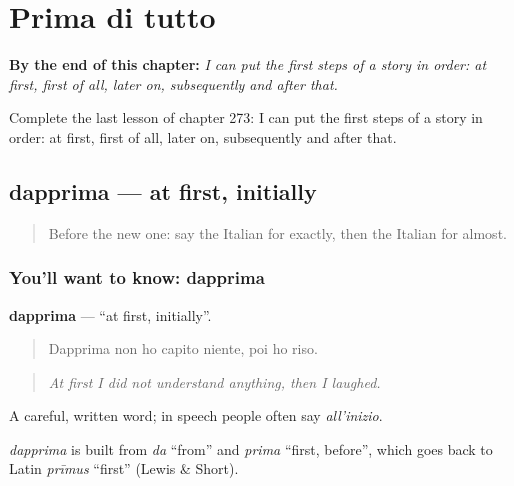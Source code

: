 
\chapter{Prima di tutto}
\label{ch:it-prima-di-tutto}

\begin{chapteropening}
\textbf{By the end of this chapter:} \emph{I can put the first steps of a story in order: at first, first of all, later on, subsequently and after that.}

Complete the last lesson of chapter 273: I can put the first steps of a story in order: at first, first of all, later on, subsequently and after that.
\end{chapteropening}

\section[dapprima]{dapprima — at first, initially}

\label{lesson:IT-C273-dapprima}



\begin{quote}
Before the new one: say the Italian for exactly, then the Italian for almost.
\end{quote}

\subsection*{You'll want to know: dapprima}
\textbf{dapprima} — \textquotedblleft{}at first, initially\textquotedblright{}.

\begin{quote}
Dapprima non ho capito niente, poi ho riso.
\end{quote}

\begin{quote}
\emph{At first I did not understand anything, then I laughed.}
\end{quote}

A careful, written word; in speech people often say \emph{all'inizio}.

\begin{cousinweb}
\emph{dapprima} is built from \emph{da} \textquotedblleft{}from\textquotedblright{} and \emph{prima} \textquotedblleft{}first, before\textquotedblright{}, which goes back to Latin \emph{prīmus} \textquotedblleft{}first\textquotedblright{} (Lewis \& Short).
\end{cousinweb}

